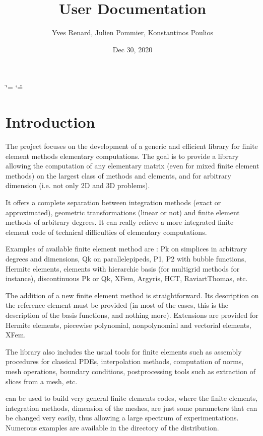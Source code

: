 \documentclass[a4paper,11pt,english]{sphinxmanual}
\title{User Documentation}
\date{Dec 30, 2020}
\author{Yves Renard, Julien Pommier, Konstantinos Poulios}
\begin{document}
\ifdefined\shorthandoff
  \ifnum\catcode`\=\string=\active\shorthandoff{=}\fi
  \ifnum\catcode`\"=\active{}\fi
\fi

\pagestyle{empty}
\sphinxmaketitle
\pagestyle{plain}
\sphinxtableofcontents
\pagestyle{normal}
\label{\detokenize{userdoc/index::doc}}



\chapter{Introduction}
\label{\detokenize{userdoc/intro:introduction}}\label{\detokenize{userdoc/intro:ud-intro}}\label{\detokenize{userdoc/intro::doc}}
The  project focuses on the development of a generic and
efficient  library for finite element methods elementary
computations. The goal is to provide a library allowing the
computation of any elementary matrix (even for mixed finite element
methods) on the largest class of methods and elements, and for
arbitrary dimension (i.e. not only 2D and 3D problems).

It offers a complete separation between integration methods (exact or
approximated), geometric transformations (linear or not) and finite
element methods of arbitrary degrees. It can really relieve a more
integrated finite element code of technical difficulties of
elementary computations.

Examples of available finite element method are : Pk on simplices in
arbitrary degrees and dimensions, Qk on parallelepipeds, P1, P2 with
bubble functions, Hermite elements, elements with hierarchic basis
(for multigrid methods for instance), discontinuous Pk or Qk, XFem,
Argyris, HCT, Raviart\sphinxhyphen{}Thomas, etc.

The addition of a new finite element method is straightforward. Its
description on the reference element must be provided (in most of the
cases, this is the description of the basis functions, and nothing
more). Extensions are provided for Hermite elements, piecewise
polynomial, non\sphinxhyphen{}polynomial and vectorial elements, XFem.

The library also includes the usual tools for finite elements such as
assembly procedures for classical PDEs, interpolation methods,
computation of norms, mesh operations, boundary conditions,
post\sphinxhyphen{}processing tools such as extraction of slices from a mesh, etc.

 can be used to build very general finite elements codes, where
the finite elements, integration methods, dimension of the meshes,
are just some parameters that can be changed very easily, thus
allowing a large spectrum of experimentations. Numerous examples are
available in the  directory of the distribution.
\end{document}
